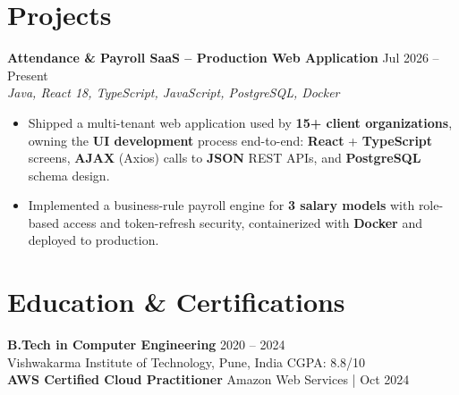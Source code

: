 \documentclass[a4paper,10pt]{article}
\begin{document}
\section*{Projects}

\textbf{Attendance \& Payroll SaaS -- Production Web Application} \hfill Jul 2026 -- Present \\
\textit{Java, React 18, TypeScript, JavaScript, PostgreSQL, Docker}
\begin{itemize}[leftmargin=*]
    \item Shipped a multi-tenant web application used by \textbf{15+ client organizations}, owning the \textbf{UI development} process end-to-end: \textbf{React} + \textbf{TypeScript} screens, \textbf{AJAX} (Axios) calls to \textbf{JSON} REST APIs, and \textbf{PostgreSQL} schema design.
    \item Implemented a business-rule payroll engine for \textbf{3 salary models} with role-based access and token-refresh security, containerized with \textbf{Docker} and deployed to production.
\end{itemize}

\section*{Education \& Certifications}
\textbf{B.Tech in Computer Engineering} \hfill 2020 -- 2024 \\
Vishwakarma Institute of Technology, Pune, India \hfill CGPA: 8.8/10 \\
\textbf{AWS Certified Cloud Practitioner} \hfill Amazon Web Services \;|\; Oct 2024
\end{document}
